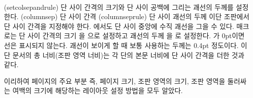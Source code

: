 \begin{syntax}
\cmd{\setcolsepandrule} \\
\end{syntax}
\glossary(setcolsepandrule)%
  {}%
  {단 사이 간격의 크기와 단 사이 공백에 그리는 괘선의 두께를 설정한다.}
\glossary(columnsep)%
  {}%
  {단 사이 간격}
\glossary(columnseprule)%
  {}%
  {단 사이 괘선의 두께}
이단 조판에서 단 사이 간격을 지정해야 한다. \ltx 에서도 단 사이 중앙에
수직 괘선을 그을 수 있다. \cmd{\setcolsepandrule} 매크로는
단 사이 간격의 크기 \lnc{\columnsep}을 으로 설정하고
괘선의 두께 \lnc{\columnseprule}을 로 설정한다.
가 0pt이면 선은 표시되지 않는다.
괘선이 보이게 할 때 보통 사용하는 두께는 0.4pt 정도이다.
이단 문서의 총 너비(조판 영역 너비)는 각 단의 본문 너비에 단 사이 간격을
더한 것과 같다.

이리하여 페이지의 주요 부분 즉,
페이지 크기, 조판 영역의 크기, 조판 영역을 둘러싸는 여백의 크기에 해당하는 레이아웃 설정 방법을 모두 알았다.

